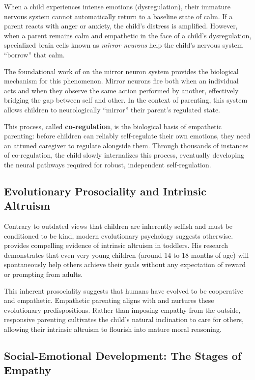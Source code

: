 When a child experiences intense emotions (dysregulation), their immature nervous system cannot automatically return to a baseline state of calm. 
If a parent reacts with anger or anxiety, the child's distress is amplified. 
However, when a parent remains calm and empathetic in the face of a child's dysregulation, specialized brain cells known as \textit{mirror neurons} help the child's nervous system ``borrow'' that calm.

The foundational work of \citet{rizzolatti2004} on the mirror neuron system provides the biological mechanism for this phenomenon. 
Mirror neurons fire both when an individual acts and when they observe the same action performed by another, effectively bridging the gap between self and other. 
In the context of parenting, this system allows children to neurologically ``mirror'' their parent's regulated state.

This process, called \textbf{co-regulation}, is the biological basis of empathetic parenting: before children can reliably self-regulate their own emotions, they need an attuned caregiver to regulate alongside them. 
Through thousands of instances of co-regulation, the child slowly internalizes this process, eventually developing the neural pathways required for robust, independent self-regulation.

\subsection{Evolutionary Prosociality and Intrinsic Altruism}

Contrary to outdated views that children are inherently selfish and must be conditioned to be kind, modern evolutionary psychology suggests otherwise. \citet{warneken2018} provides compelling evidence of intrinsic altruism in toddlers. 
His research demonstrates that even very young children (around 14 to 18 months of age) will spontaneously help others achieve their goals without any expectation of reward or prompting from adults.

This inherent prosociality suggests that humans have evolved to be cooperative and empathetic. 
Empathetic parenting aligns with and nurtures these evolutionary predispositions. 
Rather than imposing empathy from the outside, responsive parenting cultivates the child's natural inclination to care for others, allowing their intrinsic altruism to flourish into mature moral reasoning.

\subsection{Social-Emotional Development: The Stages of Empathy}

